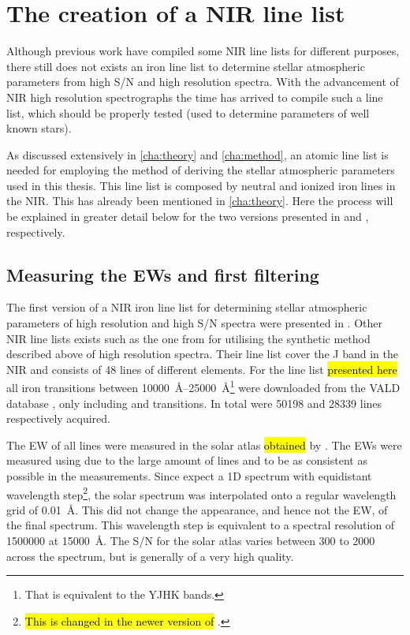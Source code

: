 \section{The creation of a NIR line list}
\label{sec:linelist_first}

Although previous work \citep[see e.g.][]{Onehag2012,Shetrone2015,Lindgren2016} have compiled some
NIR line lists for different purposes, there still does not exists an iron line list to determine
stellar atmospheric parameters from high S/N and high resolution spectra. With the advancement of
NIR high resolution spectrographs the time has arrived to compile such a line list, which should be
properly tested (used to determine parameters of well known stars).

As discussed extensively in \cref{cha:theory} and \cref{cha:method}, an atomic line list is needed
for employing the method of deriving the stellar atmospheric parameters used in this thesis. This
line list is composed by neutral and ionized iron lines in the NIR. This has already been mentioned
in \cref{cha:theory}. Here the process will be explained in greater detail below for the two
versions presented in \citet{Andreasen2016} and \citet{Andreasen2017b}, respectively.


\subsection{Measuring the EWs and first filtering}

The first version of a NIR iron line list for determining stellar atmospheric parameters of high
resolution and high S/N spectra were presented in \citet{Andreasen2016}. Other NIR line lists exists
such as the one from \citet{Onehag2012,Lindgren2016} for utilising the synthetic method described
above of high resolution spectra. Their line list cover the J band in the NIR and consists of 48
lines of different elements. For the line list \hl{presented here} all iron transitions between
\SIrange{10000}{25000}{\angstrom}\footnote{That is equivalent to the YJHK bands.} were downloaded
from the VALD database \citep{VALD1,VALD2}, only including  and  transitions.
In total were \num{50198}  and \num{28339}  lines respectively acquired.

The EW of all lines were measured in the solar atlas \hl{obtained} by \citep{Hinkle1995}. The EWs
were measured using  due to the large amount of lines and to be as consistent as possible
in the measurements. Since  expect a 1D spectrum with equidistant wavelength
step\footnote{\hl{This is changed in the newer version of}  \citep{Sousa2015a}.}, the
solar spectrum was interpolated onto a regular wavelength grid of \SI{0.01}{\angstrom}. This did not
change the appearance, and hence not the EW, of the final spectrum. This wavelength step is
equivalent to a spectral resolution of \num{1500000} at \SI{15000}{\angstrom}. The S/N for the solar
atlas varies between 300 to 2000 across the spectrum, but is generally of a very high quality.

